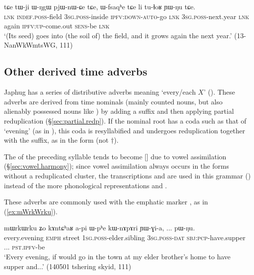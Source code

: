 \begin{exe}
\ex \label{ex:Wfsqaqhe}
\gll   tɕe tɯ-ji ɯ-ŋgɯ pjɯ-nɯ-ɕe tɕe, ɯ-fsaqʰe tɕe li tu-ɬoʁ ɲɯ-ŋu tɕe.   \\
 \textsc{lnk} \textsc{indef}.\textsc{poss}-field \textsc{3sg}.\textsc{poss}-inside \textsc{ipfv}:\textsc{down}-\textsc{auto}-go  \textsc{lnk} \textsc{3sg}.\textsc{poss}-next.year \textsc{lnk} again \textsc{ipfv}:\textsc{up}-come.out \textsc{sens}-be \textsc{lnk}  \\
\glt `(Its seed) goes into (the soil of) the field, and it grows again the next year.' (13-NanWkWmtsWG, 111)
\end{exe}

 \subsection{Other derived time adverbs} \label{sec:time.adv}
Japhug has a series of distributive adverbs meaning `every/each $X$' (). These adverbs are derived from time nominals (mainly counted nouns, but also alienably possessed nouns like ) by adding a suffix  and then applying partial reduplication (§\ref{sec:partial.redp}). If the nominal root has a coda such as that of  `evening' (as in ), this coda is resyllabified and undergoes reduplication together with the suffix, as in the form  (not $\dagger$). 

The  of the preceding syllable tends to become [] due to vowel assimilation (§\ref{sec:vowel.harmony}); since vowel assimilation always occurs in the forms without a reduplicated cluster, the transcriptions   and    are used in this grammar () instead of the more phonological representations  and .

These adverbs are commonly used with the emphatic marker , as in (\ref{ex:mWrkWrku}).


\begin{exe}
\ex \label{ex:mWrkWrku}
\gll  mɯrkɯrku ʑo kɤntɕʰaʁ a-pi ɯ-pʰe kɯ-nɤpɤri ɲɯ-ɣi-a, ... pɯ-ŋu. \\
every.evening \textsc{emph} {street} \textsc{1sg}.\textsc{poss}-elder.sibling \textsc{3sg}.\textsc{poss}-\textsc{dat} \textsc{sbj}:\textsc{pcp}-have.supper ... \textsc{pst}.\textsc{ipfv}-be \\
\glt `Every evening, if would go in the town at my elder brother's home to have supper and...' (140501 tshering skyid, 111)
\end{exe}


